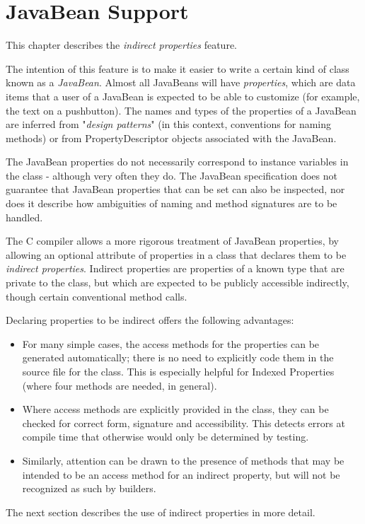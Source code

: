 \section{JavaBean Support}\label{refappb}
 
This chapter describes the  \emph{indirect
properties} feature.
 
The intention of this feature is to make it easier to write a certain
kind of class known as a \emph{JavaBean}.
Almost all JavaBeans will have \emph{properties}, which are data items
that a user of a JavaBean is expected to be able to customize (for
example, the text on a pushbutton).  The names and types of the
properties of a JavaBean are inferred from "\emph{design
patterns}" (in this context, conventions for naming methods) or
from PropertyDescriptor objects associated with the JavaBean.
 
The JavaBean properties do not necessarily correspond to instance
variables in the class - although very often they do.  The
JavaBean specification does not guarantee that JavaBean properties
that can be set can also be inspected, nor does it describe how
ambiguities of naming and method signatures are to be handled.
 
The \nr{}C compiler
allows a more rigorous
treatment of JavaBean properties, by allowing an optional attribute of
properties in a class that declares them to be \emph{indirect
properties}.  Indirect properties are properties of a known type
that are private to the class, but which are expected to be publicly
accessible indirectly, though certain conventional method calls.
 
Declaring properties to be indirect offers the following advantages:
\begin{itemize}
\item For many simple cases, the access methods for the properties can be
generated automatically; there is no need to explicitly code them in the
source file for the class.  This is especially helpful for Indexed
Properties (where four methods are needed, in general).
\item Where access methods are explicitly provided in the class, they can
be checked for correct form, signature and accessibility.  This detects
errors at compile time that otherwise would only be determined by
testing.
\item Similarly, attention can be drawn to the presence of methods that
may be intended to be an access method for an indirect property, but
will not be recognized as such by builders.
\end{itemize}
 The next section describes the use of indirect properties in more
detail.
